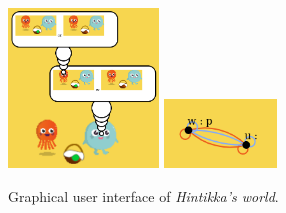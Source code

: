 \begin{figure}
	\begin{center}
		\includegraphics[width=4cm]{images/screenshot.png} 
		\includegraphics[width=3cm]{images/hintikkas_world_epistemicmodel.png} 
	\end{center}
	\caption{Graphical user interface of \emph{Hintikka's world}.\label{figure:gui}}
\end{figure}
